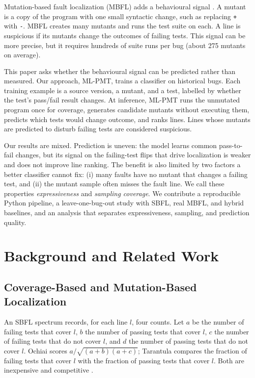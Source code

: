 \documentclass[10pt,conference]{IEEEtran}
\begin{document}
Mutation-based fault localization (MBFL) adds a behavioural signal \cite{b3,b4}. A mutant is a copy of the program with one small syntactic change, such as replacing \texttt{+} with \texttt{-}. MBFL creates many mutants and runs the test suite on each. A line is suspicious if its mutants change the outcomes of failing tests. This signal can be more precise, but it requires hundreds of suite runs per bug (about 275 mutants on average).

This paper asks whether the behavioural signal can be predicted rather than measured. Our approach, ML-PMT, trains a classifier on historical bugs. Each training example is a source version, a mutant, and a test, labelled by whether the test's pass/fail result changes. At inference, ML-PMT runs the unmutated program once for coverage, generates candidate mutants without executing them, predicts which tests would change outcome, and ranks lines. Lines whose mutants are predicted to disturb failing tests are considered suspicious.

Our results are mixed. Prediction is uneven: the model learns common pass-to-fail changes, but its signal on the failing-test flips that drive localization is weaker and does not improve line ranking. The benefit is also limited by two factors a better classifier cannot fix: (i) many faults have no mutant that changes a failing test, and (ii) the mutant sample often misses the fault line. We call these properties \emph{expressiveness} and \emph{sampling coverage}. We contribute a reproducible Python pipeline, a leave-one-bug-out study with SBFL, real MBFL, and hybrid baselines, and an analysis that separates expressiveness, sampling, and prediction quality.

\section{Background and Related Work}

\subsection{Coverage-Based and Mutation-Based Localization}

An SBFL spectrum records, for each line $l$, four counts. Let $a$ be the number of failing tests that cover $l$, $b$ the number of passing tests that cover $l$, $c$ the number of failing tests that do not cover $l$, and $d$ the number of passing tests that do not cover $l$. Ochiai \cite{b2} scores $a/\sqrt{(a+b)(a+c)}$; Tarantula \cite{b1} compares the fraction of failing tests that cover $l$ with the fraction of passing tests that cover $l$. Both are inexpensive and competitive \cite{b7}.
\end{document}
